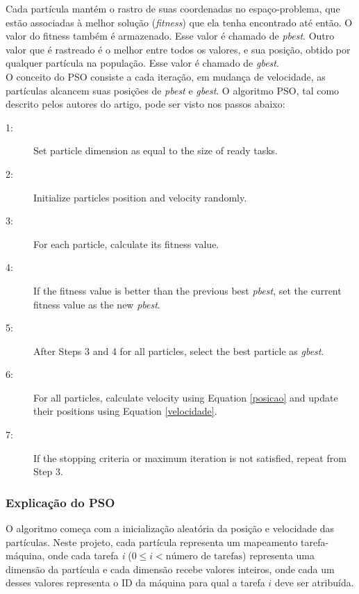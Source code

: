 \documentclass[a4paper,10pt]{article}
\begin{document}
Cada partícula mantém o rastro de suas coordenadas no espaço-problema, que estão associadas à 
melhor solução (\emph{fitness}) que ela tenha encontrado até então. O valor do fitness também é armazenado. 
Esse valor é chamado de \emph{pbest}. Outro valor que é rastreado é o melhor entre todos os valores, e sua posição, 
obtido por qualquer partícula na população. Esse valor é chamado de \emph{gbest}.\\

O conceito do PSO consiste a cada iteração, em mudança de velocidade, as partículas 
alcancem suas posições de \emph{pbest} e \emph{gbest}. O algoritmo PSO, tal como descrito pelos 
autores do artigo, pode ser visto nos passos abaixo:\\

\begin{description}
\item[1:] Set particle dimension as equal to the size of ready tasks.
\item[2:] Initialize particles position and velocity randomly.
\item[3:] For each particle, calculate its fitness value.
\item[4:] If the fitness value is better than the previous best \emph{pbest}, set the current fitness value as the new \emph{pbest}.
\item[5:] After Steps 3 and 4 for all particles, select the best particle as \emph{gbest}.
\item[6:] For all particles, calculate velocity using Equation \eqref{posicao} and update their positions using Equation \eqref{velocidade}.
\item[7:] If the stopping criteria or maximum iteration is not satisfied, repeat from Step 3.
\end{description}



\subsubsection{Explicação do PSO}

O algoritmo começa com a inicialização aleatória da posição e velocidade das partículas. Neste projeto, 
cada partícula representa um mapeamento tarefa-máquina, onde cada tarefa \emph{i} ($0 \leq i < \text{número de tarefas}$) representa uma dimensão da partícula
e cada dimensão recebe valores inteiros, onde cada um desses valores representa o ID da máquina para qual a tarefa $i$ deve ser atribuída.\\
\end{document}
